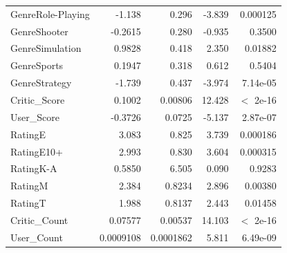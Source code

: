 \documentclass[12pt]{article}
\begin{document}
\begin{table}[ht]
\begin{tabular}{lrrrr}
    GenreRole-Playing & -1.138 & 0.296 & -3.839 & 0.000125 \\
    GenreShooter & -0.2615 & 0.280 & -0.935 & 0.3500 \\
    GenreSimulation & 0.9828 & 0.418 & 2.350 & 0.01882 \\
    GenreSports & 0.1947 & 0.318 & 0.612 & 0.5404 \\
    GenreStrategy & -1.739 & 0.437 & -3.974 & 7.14e-05 \\
    Critic\_Score & 0.1002 & 0.00806 & 12.428 & $<$ 2e-16 \\
    User\_Score & -0.3726 & 0.0725 & -5.137 & 2.87e-07 \\
    RatingE & 3.083 & 0.825 & 3.739 & 0.000186 \\
    RatingE10+ & 2.993 & 0.830 & 3.604 & 0.000315 \\
    RatingK-A & 0.5850 & 6.505 & 0.090 & 0.9283 \\
    RatingM & 2.384 & 0.8234 & 2.896 & 0.00380 \\
    RatingT & 1.988 & 0.8137 & 2.443 & 0.01458 \\
    Critic\_Count & 0.07577 & 0.00537 & 14.103 & $<$ 2e-16 \\
    User\_Count & 0.0009108 & 0.0001862 & 5.811 & 6.49e-09 \\
    \hline
  \end{tabular}
\end{table}
\end{document}
